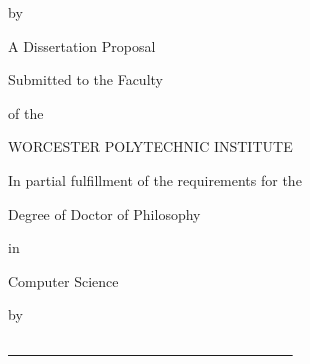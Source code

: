 \documentclass[12pt, oneside]{book} %
\begin{document}

\pagestyle{empty} %
\frontmatter %

\begin{titlepage}
\begin{center}

\vspace{-5.0cm}

\textcolor{black}{\Large\textbf{\thetitle}}

\vspace{0.2cm}

by

\vspace{0.2cm}


\vspace{0.55cm}

A Dissertation Proposal

\vspace{0.2cm}

Submitted to the Faculty

\vspace{0.2cm}

of the

\vspace{0.2cm}

WORCESTER POLYTECHNIC INSTITUTE

\vspace{0.2cm}

In partial fulfillment of the requirements for the 

\vspace{0.2cm}

Degree of Doctor of Philosophy

\vspace{0.2cm}

in

\vspace{0.2cm}

Computer Science 

\vspace{0.2cm}

by

\vspace{0.55cm}

\underline{\textcolor{white}{-------------------------------------------------------------}}\\


\end{center}
\end{titlepage}
\end{document}
